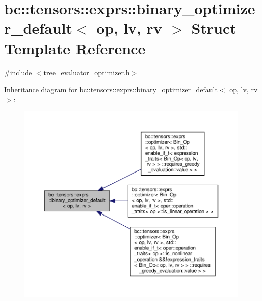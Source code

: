 \hypertarget{structbc_1_1tensors_1_1exprs_1_1binary__optimizer__default}{}\section{bc\+:\+:tensors\+:\+:exprs\+:\+:binary\+\_\+optimizer\+\_\+default$<$ op, lv, rv $>$ Struct Template Reference}
\label{structbc_1_1tensors_1_1exprs_1_1binary__optimizer__default}


{\ttfamily \#include $<$tree\+\_\+evaluator\+\_\+optimizer.\+h$>$}



Inheritance diagram for bc\+:\+:tensors\+:\+:exprs\+:\+:binary\+\_\+optimizer\+\_\+default$<$ op, lv, rv $>$\+:\nopagebreak
\begin{figure}[H]
\begin{center}
\leavevmode
\includegraphics[width=350pt]{structbc_1_1tensors_1_1exprs_1_1binary__optimizer__default__inherit__graph}
\end{center}
\end{figure}
